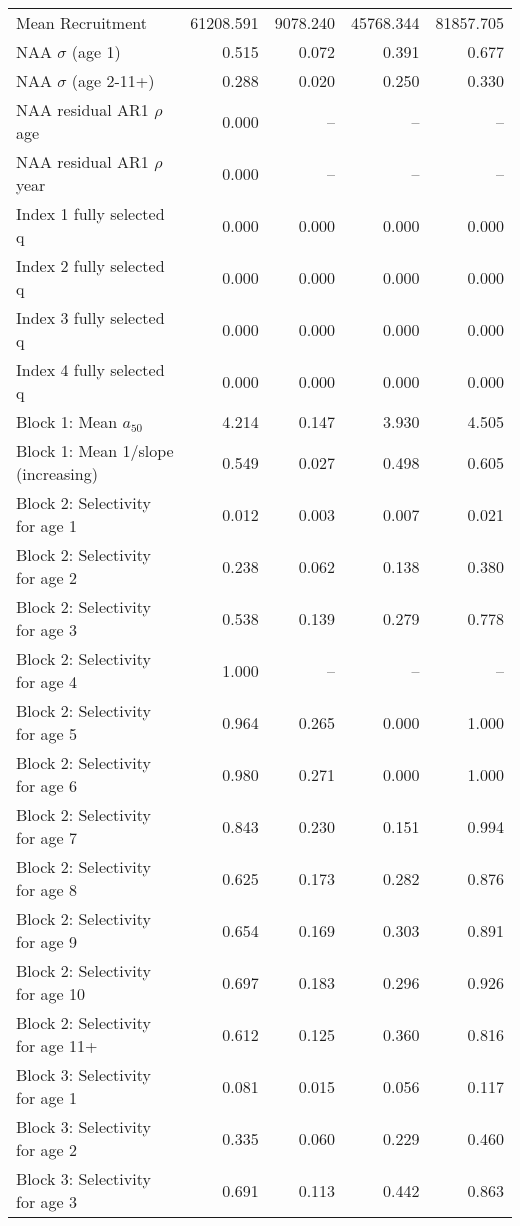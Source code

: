 \documentclass[
]{article}
\begin{document}
\begin{landscape}
\begin{longtable}[t]{lrrrr}
\endfoot
\bottomrule
\endlastfoot
Mean Recruitment & 61208.591 & 9078.240 & 45768.344 & 81857.705\\
NAA $\sigma$ (age 1) & 0.515 & 0.072 & 0.391 & 0.677\\
NAA $\sigma$ (age 2-11+) & 0.288 & 0.020 & 0.250 & 0.330\\
NAA residual AR1 $\rho$ age & 0.000 & -- & -- & --\\
NAA residual AR1 $\rho$ year & 0.000 & -- & -- & --\\
\addlinespace
Index 1 fully selected q & 0.000 & 0.000 & 0.000 & 0.000\\
Index 2 fully selected q & 0.000 & 0.000 & 0.000 & 0.000\\
Index 3 fully selected q & 0.000 & 0.000 & 0.000 & 0.000\\
Index 4 fully selected q & 0.000 & 0.000 & 0.000 & 0.000\\
Block 1: Mean $a_{50}$ & 4.214 & 0.147 & 3.930 & 4.505\\
\addlinespace
Block 1: Mean 1/slope (increasing) & 0.549 & 0.027 & 0.498 & 0.605\\
Block 2: Selectivity for age 1 & 0.012 & 0.003 & 0.007 & 0.021\\
Block 2: Selectivity for age 2 & 0.238 & 0.062 & 0.138 & 0.380\\
Block 2: Selectivity for age 3 & 0.538 & 0.139 & 0.279 & 0.778\\
Block 2: Selectivity for age 4 & 1.000 & -- & -- & --\\
\addlinespace
Block 2: Selectivity for age 5 & 0.964 & 0.265 & 0.000 & 1.000\\
Block 2: Selectivity for age 6 & 0.980 & 0.271 & 0.000 & 1.000\\
Block 2: Selectivity for age 7 & 0.843 & 0.230 & 0.151 & 0.994\\
Block 2: Selectivity for age 8 & 0.625 & 0.173 & 0.282 & 0.876\\
Block 2: Selectivity for age 9 & 0.654 & 0.169 & 0.303 & 0.891\\
\addlinespace
Block 2: Selectivity for age 10 & 0.697 & 0.183 & 0.296 & 0.926\\
Block 2: Selectivity for age 11+ & 0.612 & 0.125 & 0.360 & 0.816\\
Block 3: Selectivity for age 1 & 0.081 & 0.015 & 0.056 & 0.117\\
Block 3: Selectivity for age 2 & 0.335 & 0.060 & 0.229 & 0.460\\
Block 3: Selectivity for age 3 & 0.691 & 0.113 & 0.442 & 0.863\\

\end{longtable}
\end{landscape}
\end{document}
